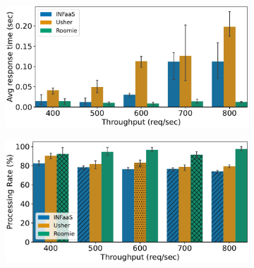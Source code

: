 \begin{figure}[h!]
	\centering
	\begin{subfigure}[b]{0.45\textwidth}
		\centering
		\includegraphics[width=\textwidth]{chapters/roomie/images/JetsonNano/synthetic-all-models/response_time.pdf}
	\end{subfigure}
	\hfill
	\begin{subfigure}[b]{0.45\textwidth}
		\centering
		\includegraphics[width=\textwidth]{chapters/roomie/images/JetsonNano/synthetic-all-models/normalized.pdf}
	\end{subfigure}
	
	\vspace{0.5cm} %
	

\end{figure}
